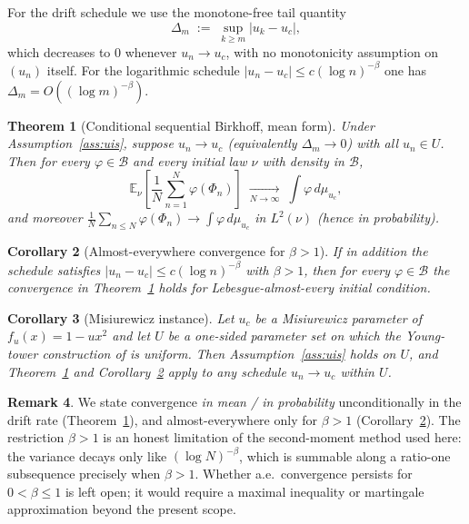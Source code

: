 \documentclass[11pt,a4paper]{article}
\newtheorem{theorem}{Theorem}[section]
\newtheorem{corollary}[theorem]{Corollary}
\theoremstyle{definition}
\newtheorem{remark}[theorem]{Remark}
\begin{document}
For the drift schedule we use the monotone-free tail quantity
\[
  \Delta_m \;:=\; \sup_{k\ge m}|u_k - u_c|,
\]
which decreases to $0$ whenever $u_n\to u_c$, with no monotonicity
assumption on $(u_n)$ itself. For the logarithmic schedule
$|u_n-u_c|\le c(\log n)^{-\beta}$ one has $\Delta_m = O((\log m)^{-\beta})$.

\begin{theorem}[Conditional sequential Birkhoff, mean form]
\label{thm:main}
Under Assumption~\ref{ass:uis}, suppose $u_n\to u_c$ (equivalently
$\Delta_m\to0$) with all $u_n\in U$. Then for every
$\varphi\in\mathcal{B}$ and every initial law $\nu$ with density in
$\mathcal{B}$,
\[
  \mathbb{E}_\nu\!\left[\frac{1}{N}\sum_{n=1}^{N}
       \varphi(\Phi_n)\right]
  \;\xrightarrow[N\to\infty]{}\;
  \int \varphi\,d\mu_{u_c},
\]
and moreover $\frac1N\sum_{n\le N}\varphi(\Phi_n)\to\int\varphi\,d\mu_{u_c}$
in $L^2(\nu)$ (hence in probability).
\end{theorem}

\begin{corollary}[Almost-everywhere convergence for $\beta>1$]
\label{cor:ae}
If in addition the schedule satisfies $|u_n-u_c|\le c(\log n)^{-\beta}$
with $\beta>1$, then for every $\varphi\in\mathcal{B}$ the convergence
in Theorem~\ref{thm:main} holds for Lebesgue-almost-every initial
condition.
\end{corollary}

\begin{corollary}[Misiurewicz instance]
\label{cor:mis}
Let $u_c$ be a Misiurewicz parameter of $f_u(x)=1-ux^2$ and let
$U$ be a one-sided parameter set on which the Young-tower construction
of \cite{young1992decay} is uniform. Then Assumption~\ref{ass:uis}
holds on $U$, and Theorem~\ref{thm:main} and Corollary~\ref{cor:ae}
apply to any schedule $u_n\to u_c$ within $U$.
\end{corollary}

\begin{remark}
We state convergence \emph{in mean / in probability} unconditionally in
the drift rate (Theorem~\ref{thm:main}), and almost-everywhere only for
$\beta>1$ (Corollary~\ref{cor:ae}). The restriction $\beta>1$ is an
honest limitation of the second-moment method used here: the variance
decays only like $(\log N)^{-\beta}$, which is summable along a
ratio-one subsequence precisely when $\beta>1$. Whether a.e.\
convergence persists for $0<\beta\le1$ is left open; it would require a
maximal inequality or martingale approximation beyond the present
scope.
\end{remark}
\end{document}
